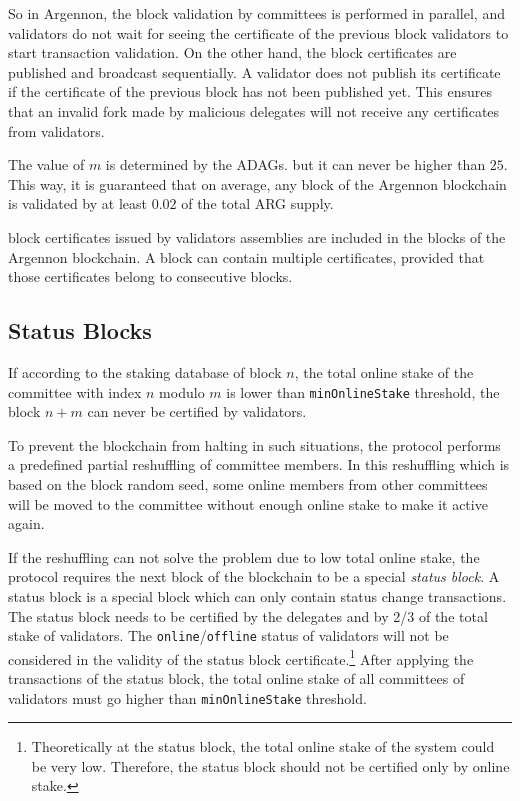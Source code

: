 So in Argennon, the block validation by committees is performed in parallel, and validators
do not wait for seeing the certificate of the previous block validators to start transaction validation. On the
other hand, the block certificates are published and broadcast sequentially. A validator does not publish its
certificate if the certificate of the previous block has not been published yet. This ensures that an invalid
fork made by malicious delegates will not receive any certificates from validators.

The value of $m$ is determined by the ADAGs. but it can never be higher than $25$. This way, it is guaranteed
that on average, any block of the Argennon blockchain is validated by at least $0.02$ of the total ARG supply.

block certificates issued by validators assemblies are included in the blocks of the Argennon blockchain.
A block can contain multiple certificates, provided that
those certificates belong to consecutive blocks.

\subsection{Status Blocks}\label{subsec:status-blocks}

If according to the staking database of block $n$, the total online stake of the committee with index $n$ modulo $m$ is
lower than \texttt{minOnlineStake} threshold, the block $n + m$ can never be certified by validators.

To prevent the blockchain from halting in such situations, the protocol performs a predefined partial
reshuffling of committee members.
In this reshuffling which is based on the block random seed, some online members from other committees will
be moved to the committee without enough online stake to make it active again.

If the reshuffling can not solve the problem due to low total online stake, the protocol requires the next block
of the blockchain to be a special \emph{status block}. A status block is a special block which can only contain
status change transactions. The status block needs to be certified by the delegates and by 2/3 of the total stake of
validators. The \texttt{online}/\texttt{offline} status of validators will not be considered in the validity of
the status block certificate.\footnote{Theoretically at the status block, the total online stake of the system could
be very low. Therefore, the status block should not be certified only by online stake.} After applying
the transactions of the status block, the total online stake of all committees of validators
must go higher than \texttt{minOnlineStake} threshold.

